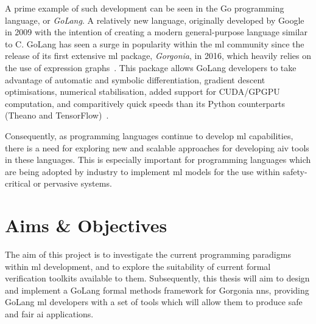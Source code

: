 
A prime example of such development can be seen in the Go programming language, or \textit{GoLang}. A relatively new language, originally developed by Google in 2009 with the intention
of creating a modern general-purpose language similar to C. 
GoLang has seen a surge in popularity within the \gls{ml} community since
the release of its first extensive \gls{ml} package, \textit{Gorgonia}, in 2016, which heavily relies on the use of expression graphs~\citep{chew2016}.
This package allows GoLang developers
to take advantage of automatic and symbolic differentiation, gradient descent optimisations, numerical stabilisation,
added support for CUDA/GPGPU computation, and comparitively quick speeds than its Python counterparts (Theano and TensorFlow)~\citep{golang2020}.


Consequently, as programming languages continue to develop \gls{ml} capabilities, there is a need for 
exploring new and scalable approaches for developing \gls{aiv} tools in these languages.
This is especially important for programming languages which are being adopted by industry to implement \gls{ml} models
for the use within safety-critical or pervasive systems.

\section{Aims \& Objectives}






The aim of this project is to investigate the current programming paradigms within \gls{ml} development,
and to explore the suitability of current formal verification toolkits available to them. Subsequently,
this thesis will aim to design and implement a GoLang formal methods framework for Gorgonia \glspl{nn},
providing GoLang \gls{ml} developers with a set of tools which will allow them to produce safe and
fair \gls{ai} applications.

